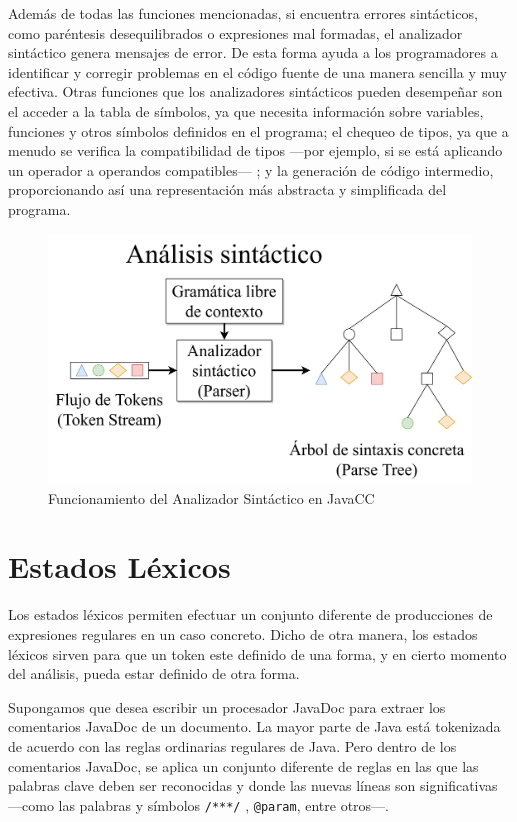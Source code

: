 Además de todas las funciones mencionadas, si encuentra errores sintácticos, como paréntesis desequilibrados o expresiones mal formadas, el analizador sintáctico genera mensajes de error\cite{traductorescompiladoreseinterpretes}. De esta forma ayuda a los programadores a identificar y corregir problemas en el código fuente de una manera sencilla y muy efectiva. Otras funciones que los analizadores sintácticos pueden desempeñar son el acceder a la tabla de símbolos, ya que necesita información sobre variables, funciones y otros símbolos definidos en el programa; el chequeo de tipos, ya que a menudo se verifica la compatibilidad de tipos ---por ejemplo, si se está aplicando un operador a operandos compatibles--- ; y la generación de código intermedio, proporcionando así una representación más abstracta y simplificada del programa.

\begin{figure}[H]
	\centering
	\includegraphics[width=\textwidth]{imagenes/analizadorsintactico.png}
	\caption{\label{fig:analizadorsintactico}Funcionamiento del Analizador Sintáctico en JavaCC\cite{ytanalizadorsintactico}}
\end{figure}

\section{Estados Léxicos}
\noindent Los estados léxicos permiten efectuar un conjunto diferente de producciones de expresiones regulares en un caso concreto. Dicho de otra manera, los estados léxicos sirven para que un token este definido de una forma, y en cierto momento del análisis, pueda estar definido de otra forma.

Supongamos que desea escribir un procesador JavaDoc para extraer los comentarios JavaDoc de un documento. La mayor parte de Java está tokenizada de acuerdo con las reglas ordinarias regulares de Java. Pero dentro de los comentarios JavaDoc, se aplica un conjunto diferente de reglas en las que las palabras clave deben ser reconocidas y donde las nuevas líneas son significativas ---como las palabras y símbolos \lstinline|/***/| , \lstinline|@param|, entre otros---.

